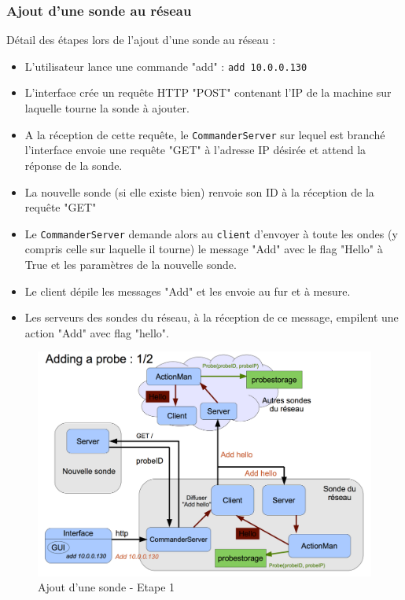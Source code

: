 \documentclass[a4paper,11pt]{article}
\begin{document}
\subsubsection{Ajout d'une sonde au réseau}

Détail des étapes lors de l'ajout d'une sonde au réseau :
\begin{itemize}
\item L'utilisateur lance une commande "add" : \texttt{add 10.0.0.130}
\item L'interface crée un requête HTTP "POST" contenant l'IP de la machine sur laquelle tourne la sonde à ajouter.
\item A la réception de cette requête, le \texttt{CommanderServer} sur lequel est branché l'interface envoie une requête "GET" à l'adresse IP désirée et attend la réponse de la sonde.
\item La nouvelle sonde (si elle existe bien) renvoie son ID à la réception de la requête "GET"
\item Le \texttt{CommanderServer} demande alors au \texttt{client} d'envoyer à toute les ondes (y compris celle sur laquelle il tourne) le message "Add" avec le flag "Hello" à True et les paramètres de la nouvelle sonde.
\item Le client dépile les messages "Add" et les envoie au fur et à mesure.
\item Les serveurs des sondes du réseau, à la réception de ce message, empilent une action "Add" avec flag "hello".
\end{itemize}

\begin{figure}[!ht]
\centering\includegraphics[width=0.8\linewidth]{img/graphAdd1.png}
\caption{Ajout d'une sonde - Etape 1}
\end{figure}
\end{document}
